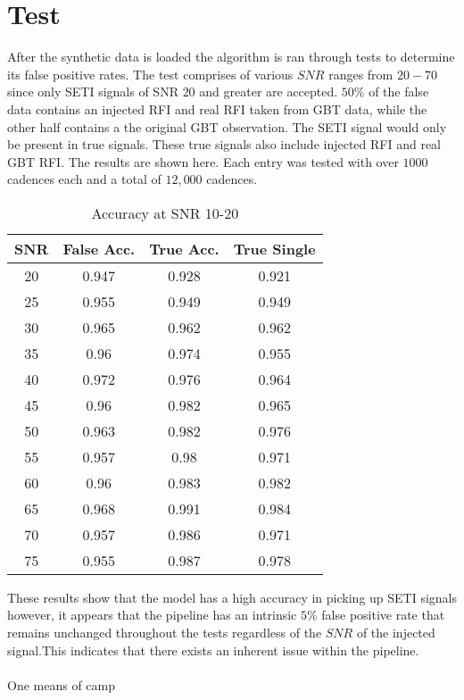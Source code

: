 \documentclass{article}
\begin{document}
\section*{Test}
After the synthetic data is loaded the algorithm is ran through tests to determine its false positive rates. The test comprises of various $SNR$ ranges from $20-70$ since only SETI signals of SNR $20$ and greater are accepted. $50\%$ of the false data contains an injected RFI and real RFI taken from GBT data, while the other half contains a the original GBT observation. The SETI signal would only be present in true signals. These true signals also include injected RFI and real GBT RFI. The results are shown here. Each entry was tested with over $1000$ cadences each and a total of $12,000$ cadences. 

\begin{table}[h!]
\centering
\begin{tabular}{||c c c c||} 
 \hline
 SNR & False Acc. & True Acc. & True Single\\ [0.5ex] 
 \hline\hline

20& 0.947& 0.928&0.921\\
25& 0.955&0.949&0.949\\
30& 0.965&0.962&0.962\\
35& 0.96&0.974&0.955\\
40& 0.972&0.976&0.964\\
45& 0.96&0.982&0.965\\
50& 0.963&0.982&0.976\\
55& 0.957&0.98&0.971\\
60& 0.96&0.983&0.982\\
65& 0.968&0.991&0.984\\
70& 0.957&0.986&0.971\\
75& 0.955&0.987&0.978  \\  
 \hline
\end{tabular}
\caption{Accuracy at SNR  10-20}
\label{table:1}
\end{table}

These results show that the model has a high accuracy in picking up SETI signals however, it appears that the pipeline has an intrinsic $5\%$ false positive rate that remains unchanged throughout the  tests regardless of the $SNR$ of the injected signal.This indicates that there exists an inherent issue within the pipeline.\\

\\
One means of camp
\end{document}

